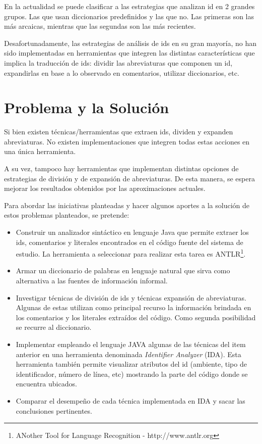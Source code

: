 \documentclass[a4paper,12pt]{report}
\begin{document}
En la actualidad se puede clasificar a las estrategias que analizan id en 2 grandes grupos. Las que usan diccionarios predefinidos y las que no. Las primeras son las más arcaicas, mientras que las segundas son las más recientes.

Desafortunadamente, las estrategias de análisis de ids en su gran mayoría, no han sido implementadas en herramientas que integren las distintas características que implica la traducción de ids: dividir las abreviaturas que componen un id, expandirlas en base a lo observado en comentarios, utilizar diccionarios, etc.

\pagebreak
\section{Problema y la Solución}

Si bien existen técnicas/herramientas que extraen ids, dividen y expanden abreviaturas. No existen implementaciones que integren todas estas acciones en una única herramienta.

A su vez, tampoco hay herramientas que implementan distintas opciones de estrategias de división y de expansión de abreviaturas. De esta manera, se espera mejorar los resultados obtenidos por las aproximaciones actuales.

Para abordar las iniciativas planteadas y hacer algunos aportes a la solución de estos problemas planteados, se pretende:

\begin{itemize}
\itemsep0em%
\item Construir un analizador sintáctico en lenguaje Java que permite extraer los ids, comentarios y literales encontrados en el código fuente del sistema de estudio. La herramienta a seleccionar para realizar esta tarea es ANTLR\footnote[1]{ANother Tool for Language Recognition - http://www.antlr.org}.

\item Armar un diccionario de palabras en lenguaje natural que sirva como alternativa a las fuentes de información informal.

\item Investigar técnicas de división de ids y técnicas expansión de abreviaturas. Algunas de estas utilizan como principal recurso la información brindada en los comentarios y los literales extraídos del código. Como segunda posibilidad se recurre al diccionario.

\item Implementar empleando el lenguaje JAVA algunas de las técnicas del item anterior en una herramienta denominada \textit{Identifier Analyzer} (IDA). Esta herramienta también permite visualizar atributos del id (ambiente, tipo de identificador, número de línea, etc) mostrando la parte del código donde se encuentra ubicados.


\item Comparar el desempeño de cada técnica implementada en IDA y sacar las conclusiones pertinentes.

\end{itemize}
\end{document}
